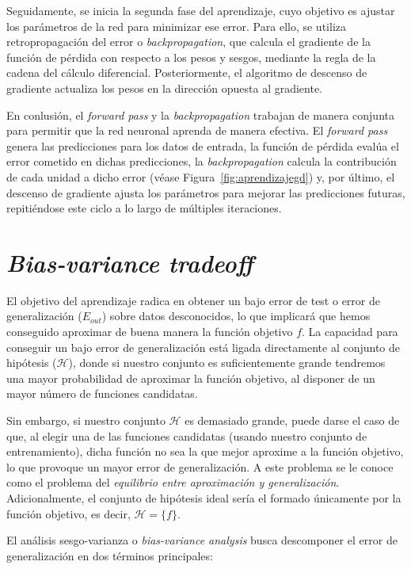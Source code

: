 Seguidamente, se inicia la segunda fase del aprendizaje, cuyo objetivo es ajustar los parámetros de la red para minimizar ese error. Para ello, se utiliza retropropagación del error o \emph{backpropagation}, que calcula el gradiente de la función de pérdida con respecto a los pesos y sesgos, mediante la regla de la cadena del cálculo diferencial. Posteriormente, el algoritmo de descenso de gradiente actualiza los pesos en la dirección opuesta al gradiente.

En conlusión, el \textit{forward pass} y la \textit{backpropagation} trabajan de manera conjunta para permitir que la red neuronal aprenda de manera efectiva. El \textit{forward pass} genera las predicciones para los datos de entrada, la función de pérdida evalúa el error cometido en dichas predicciones, la \textit{backpropagation} calcula la contribución de cada unidad a dicho error (véase Figura~\ref{fig:aprendizajegd}) y, por último, el descenso de gradiente ajusta los parámetros para mejorar las predicciones futuras, repitiéndose este ciclo a lo largo de múltiples iteraciones.

\section{\textit{Bias-variance tradeoff}}\label{sec:capitulo-bias-variance-tradeoff}
El objetivo del aprendizaje radica en obtener un bajo error de test o error de generalización ($E_{out}$) sobre datos desconocidos, lo que implicará que hemos conseguido aproximar de buena manera la función objetivo $f$. La capacidad para conseguir un bajo error de generalización está ligada directamente al conjunto de hipótesis ($\mathcal{H}$), donde si nuestro conjunto es suficientemente grande tendremos una mayor probabilidad de aproximar la función objetivo, al disponer de un mayor número de funciones candidatas.

Sin embargo, si nuestro conjunto $\mathcal{H}$ es demasiado grande, puede darse el caso de que, al elegir una de las funciones candidatas (usando nuestro conjunto de entrenamiento), dicha función no sea la que mejor aproxime a la función objetivo, lo que provoque un mayor error de generalización. A este problema se le conoce como el problema del \textit{equilibrio entre aproximación y generalización}. Adicionalmente, el conjunto de hipótesis ideal sería el formado únicamente por la función objetivo, es decir, $\mathcal{H} = \{f\}$.

El análisis sesgo-varianza o \emph{bias-variance analysis} busca descomponer el error de generalización en dos términos principales:

